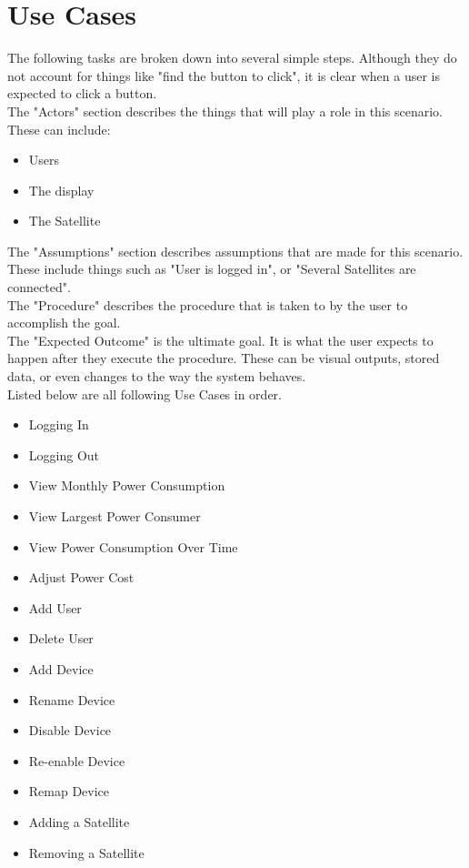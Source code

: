
\chapter{Use Cases}

The following tasks are broken down into several simple steps. 
Although they do not account for things like "find the button to click", 
it is clear when a user is expected to click a button.\\

The "Actors" section describes the things that will play a role in this scenario. 
These can include:
\begin{itemize}
	\item Users
	\item The display
	\item The Satellite
\end{itemize}

The "Assumptions" section describes assumptions that are made for this scenario. 
These include things such as "User is logged in", or "Several Satellites are connected".\\

The "Procedure" describes the procedure that is taken to by the user to accomplish the goal. \\

The "Expected Outcome" is the ultimate goal. 
It is what the user expects to happen after they execute the procedure. 
These can be visual outputs, stored data, or even changes to the way the system behaves.\\

Listed below are all following Use Cases in order.
\begin{itemize}
	\item Logging In
	\item Logging Out
	\item View Monthly Power Consumption
	\item View Largest Power Consumer
	\item View Power Consumption Over Time
	\item Adjust Power Cost
	\item Add User
	\item Delete User
	\item Add Device
	\item Rename Device
	\item Disable Device
	\item Re-enable Device
	\item Remap Device
	\item Adding a Satellite
	\item Removing a Satellite
\end{itemize}